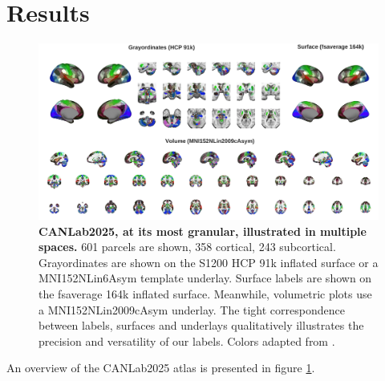 \documentclass[10pt,letterpaper]{article}
\begin{document}
\section{Results}
\begin{figure}[t!]
\centering
\includegraphics[width=\textwidth]{images/overview_figure.png}
\caption{{\bf CANLab2025, at its most granular, illustrated in multiple spaces.} 601 parcels are shown, 358 cortical, 243 subcortical. Grayordinates are shown on the S1200 HCP 91k inflated surface or a MNI152NLin6Asym template underlay. Surface labels are shown on the fsaverage 164k inflated surface. Meanwhile, volumetric plots use a MNI152NLin2009cAsym underlay. The tight correspondence between labels, surfaces and underlays qualitatively illustrates the precision and versatility of our labels. Colors adapted from .}
\label{overview-figure}
\end{figure}

An overview of the CANLab2025 atlas is presented in figure \ref{overview-figure}.
\end{document}
